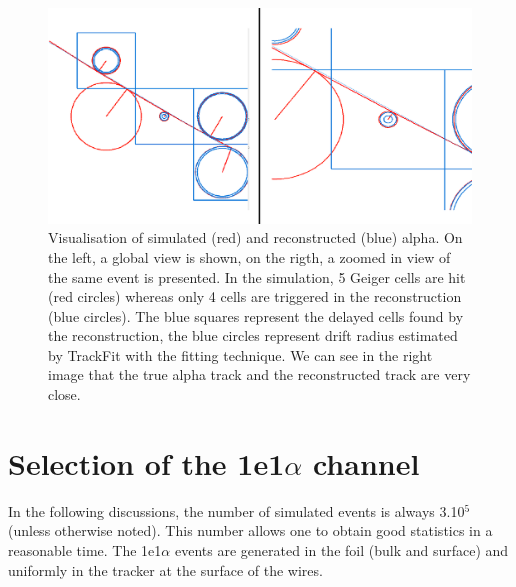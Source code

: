 \documentclass[main.tex]{subfiles}
\begin{document}
\begin{figure}[h!]
\begin{center}
\includegraphics[scale=0.6]{pictures/Chap5/dessin.pdf}
\caption{Visualisation of simulated (red) and reconstructed (blue) alpha. On the left, a global view is shown, on the rigth, a zoomed in view of the same event is presented. In the simulation, 5 Geiger cells are hit (red circles) whereas only 4 cells are triggered in the reconstruction (blue circles). The blue squares represent the delayed cells found by the reconstruction, the blue circles represent drift radius estimated by TrackFit with the fitting technique. We can see in the right image that the true alpha track and the reconstructed track are very close.}
\label{timeRecovisu}
\end{center}
\end{figure}


\FloatBarrier




\section{Selection of the 1e1$\alpha$ channel}\label{sec:Selection1e1aChannel}

	
\noindent In the following discussions, the number of simulated events is always 3.10$^\text{5}$ (unless otherwise noted). This number allows one to obtain good statistics in a reasonable time. The 1e1$\alpha$ events are generated in the foil (bulk and surface) and uniformly in the tracker at the surface of the wires. %
\end{document}
